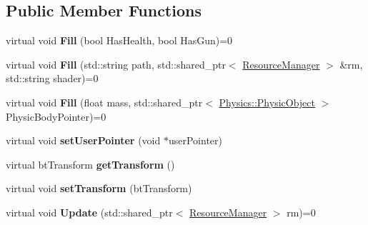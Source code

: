 \subsection*{Public Member Functions}
\begin{DoxyCompactItemize}
\item 
virtual void {\bfseries Fill} (bool Has\+Health, bool Has\+Gun)=0\hypertarget{class_component_1_1_component_a26353b4e284b63d84b929b86f6e9148b}{}\label{class_component_1_1_component_a26353b4e284b63d84b929b86f6e9148b}

\item 
virtual void {\bfseries Fill} (std\+::string path, std\+::shared\+\_\+ptr$<$ \hyperlink{class_resource_manager}{Resource\+Manager} $>$ \&rm, std\+::string shader)=0\hypertarget{class_component_1_1_component_a489a17c3dd7e1ee77959181533fa9d9a}{}\label{class_component_1_1_component_a489a17c3dd7e1ee77959181533fa9d9a}

\item 
virtual void {\bfseries Fill} (float mass, std\+::shared\+\_\+ptr$<$ \hyperlink{class_physics_1_1_physic_object}{Physics\+::\+Physic\+Object} $>$ Physic\+Body\+Pointer)=0\hypertarget{class_component_1_1_component_ae90e144d4395c5ab87bd0c6ba6b9bee7}{}\label{class_component_1_1_component_ae90e144d4395c5ab87bd0c6ba6b9bee7}

\item 
virtual void {\bfseries set\+User\+Pointer} (void $\ast$user\+Pointer)\hypertarget{class_component_1_1_component_a2dce4318453252ae4f290b06b810e31b}{}\label{class_component_1_1_component_a2dce4318453252ae4f290b06b810e31b}

\item 
virtual bt\+Transform {\bfseries get\+Transform} ()\hypertarget{class_component_1_1_component_a79cfa9368519bd1956cf52ee24636d47}{}\label{class_component_1_1_component_a79cfa9368519bd1956cf52ee24636d47}

\item 
virtual void {\bfseries set\+Transform} (bt\+Transform)\hypertarget{class_component_1_1_component_a077e191323027579fd41e1cc893a79e7}{}\label{class_component_1_1_component_a077e191323027579fd41e1cc893a79e7}

\item 
virtual void {\bfseries Update} (std\+::shared\+\_\+ptr$<$ \hyperlink{class_resource_manager}{Resource\+Manager} $>$ rm)=0\hypertarget{class_component_1_1_component_aa931d000ca1e0ba431213273755f622c}{}\label{class_component_1_1_component_aa931d000ca1e0ba431213273755f622c}


\end{DoxyCompactItemize}
